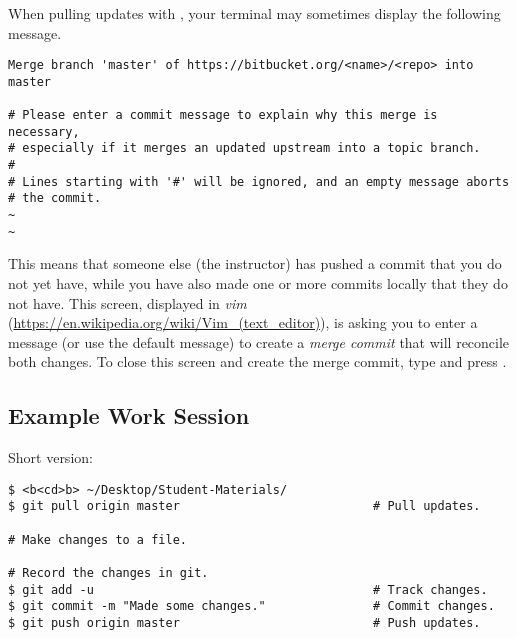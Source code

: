 \begin{info}
When pulling updates with , your terminal may sometimes display the following message.
\begin{lstlisting}
Merge branch 'master' of https://bitbucket.org/<name>/<repo> into master

# Please enter a commit message to explain why this merge is necessary,
# especially if it merges an updated upstream into a topic branch.
#
# Lines starting with '#' will be ignored, and an empty message aborts
# the commit.
~
~
\end{lstlisting}
This means that someone else (the instructor) has pushed a commit that you do not yet have, while you have also made one or more commits locally that they do not have.
This screen, displayed in \emph{vim} (\url{https://en.wikipedia.org/wiki/Vim_(text_editor)}), is asking you to enter a message (or use the default message) to create a \emph{merge commit} that will reconcile both changes.
To close this screen and create the merge commit, type  and press .
\end{info}


\subsection*{Example Work Session}

Short version:
\begin{lstlisting}
$ <b<cd>b> ~/Desktop/Student-Materials/
$ git pull origin master                           # Pull updates.

# Make changes to a file.

# Record the changes in git.
$ git add -u                                       # Track changes.
$ git commit -m "Made some changes."               # Commit changes.
$ git push origin master                           # Push updates.
\end{lstlisting}

